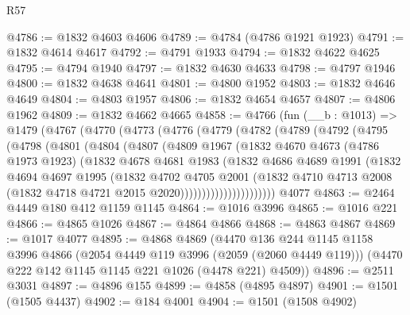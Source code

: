 \begin{lexlean}{R57}
\begin{coremodule}
@4786 := @1832 @4603 @4606
@4789 := @4784 (@4786 @1921 @1923)
@4791 := @1832 @4614 @4617
@4792 := @4791 @1933
@4794 := @1832 @4622 @4625
@4795 := @4794 @1940
@4797 := @1832 @4630 @4633
@4798 := @4797 @1946
@4800 := @1832 @4638 @4641
@4801 := @4800 @1952
@4803 := @1832 @4646 @4649
@4804 := @4803 @1957
@4806 := @1832 @4654 @4657
@4807 := @4806 @1962
@4809 := @1832 @4662 @4665
@4858 := @4766
    (fun (__b : @1013) =>
    @1479
      (@4767
        (@4770
          (@4773
            (@4776
              (@4779
                (@4782
                  (@4789
                    (@4792
                      (@4795
                        (@4798
                          (@4801
                            (@4804
                              (@4807
                                (@4809
                                  @1967
                                  (@1832
                                    @4670
                                    @4673
                                    (@4786 @1973 @1923)
                                    (@1832
                                      @4678
                                      @4681
                                      @1983
                                      (@1832
                                        @4686
                                        @4689
                                        @1991
                                        (@1832
                                          @4694
                                          @4697
                                          @1995
                                          (@1832
                                            @4702
                                            @4705
                                            @2001
                                            (@1832
                                              @4710
                                              @4713
                                              @2008
                                              (@1832 @4718 @4721 @2015 @2020))))))))))))))))))))))
    @4077
@4863 := @2464 @4449 @180 @412 @1159 @1145
@4864 := @1016 @3996
@4865 := @1016 @221
@4866 := @4865 @1026
@4867 := @4864 @4866
@4868 := @4863 @4867
@4869 := @1017 @4077
@4895 := @4868
    @4869
    (@4470
      @136
      @244
      @1145
      @1158
      @3996
      @4866
      (@2054 @4449 @119 @3996 (@2059 (@2060 @4449 @119)))
      (@4470 @222 @142 @1145 @1145 @221 @1026 (@4478 @221) @4509))
@4896 := @2511 @3031
@4897 := @4896 @155
@4899 := @4858 (@4895 @4897)
@4901 := @1501 (@1505 @4437)
@4902 := @184 @4001
@4904 := @1501 (@1508 @4902)

\end{coremodule}
\end{lexlean}
